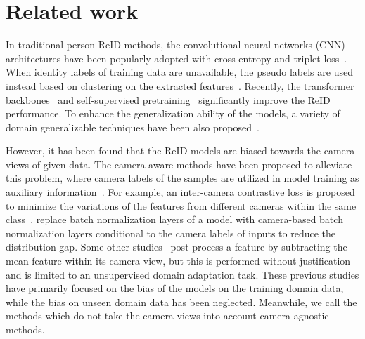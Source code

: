 


\section{Related work}
\label{sec:related_work}

In traditional person ReID methods, the convolutional neural networks (CNN) architectures have been popularly adopted with cross-entropy and triplet loss~\citep{
zheng2017discriminatively,hermans2017defense,luo2019bag,ye2021deep}.
When identity labels of training data are unavailable, the pseudo labels are used instead based on clustering on the extracted features~\citep{fan2018unsupervised,lin2019bottom,yu2019unsupervised,zhang2019self,dai2022cluster}.
Recently, the transformer backbones~\citep{he2021transreid,luo2021self,chen2023beyond} and self-supervised pretraining~\citep{fu2021unsupervised,fu2022large,luo2021self,chen2023beyond} significantly improve the ReID performance.
To enhance the generalization ability of the models, a variety of domain generalizable techniques have been also proposed~\citep{dai2021generalizable,song2019generalizable,liao2021transmatcher,pat,dou2023identity}.

However, it has been found that the ReID models are biased towards the camera views of given data.
The camera-aware methods have been proposed to alleviate this problem, where camera labels of the samples are utilized in model training as auxiliary information~\citep{luo2020generalizing,zhuang2020rethinking,zhang2021unsupervised,wang2021camera,chen2021ice,cho2022part,lee2023camera}.
For example, an inter-camera contrastive loss is proposed to minimize the variations of the features from different cameras within the same class~\citep{wang2021camera,cho2022part}.
\cite{zhuang2020rethinking} replace batch normalization layers of a model with camera-based batch normalization layers conditional to the camera labels of inputs to reduce the distribution gap.
Some other studies~\citep{gu20201st,luo2021empirical} post-process a feature by subtracting the mean feature within its camera view, but this is performed without justification and is limited to an unsupervised domain adaptation task.
These previous studies have primarily focused on the bias of the models on the training domain data, while the bias on unseen domain data has been neglected.
Meanwhile, we call the methods which do not take the camera views into account camera-agnostic methods.



